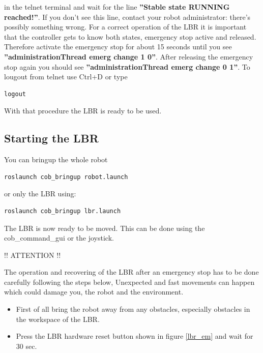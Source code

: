 in the telnet terminal and wait for the line \textbf{”Stable state RUNNING reached!”}. If you don’t see this line, contact your robot administrator: there’s possibly something wrong.
For a correct operation of the LBR it is important that the controller gets to know both states, emergency stop active and released. Therefore activate the emergency stop for about 15 seconds until you see \textbf{”administrationThread
emerg change 1 0”}. After releasing the emergency stop again you should see \textbf{”administrationThread emerg change 0 1”}.
To lougout from telnet use Ctrl+D or type
\begin{lstlisting}
logout
\end{lstlisting}
With that procedure the LBR is ready to be used.

\subsection{Starting the LBR}

You can bringup the whole robot
\begin{lstlisting}
roslaunch cob_bringup robot.launch
\end{lstlisting}

or only the LBR using:
\begin{lstlisting}
roslaunch cob_bringup lbr.launch
\end{lstlisting}

The LBR is now ready to be moved. This can be done using the cob\_command\_gui or the joystick.

\begin{center}
\begin{LARGE}
!! ATTENTION !!
\end{LARGE}
\end{center}

The operation and recovering of the LBR after an emergency stop has to be done carefully following the steps below, Unexpected and fast movements can happen which could damage you, the robot and the environment.

\begin{itemize}
\item First of all bring the robot away from any obstacles, especially obstacles in the workspace of the LBR.
\item Press the LBR hardware reset button shown in figure \ref{lbr_em} and wait for 30 sec.
\end{itemize}

